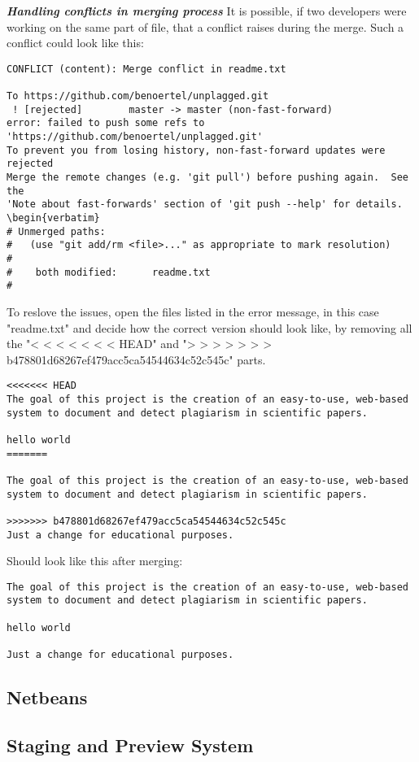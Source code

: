 \textbf{\textit{Handling conflicts in merging process}}
It is possible, if two developers were working on the same part of  file, that a conflict raises during the merge. Such a conflict could look like this:
\begin{verbatim}
CONFLICT (content): Merge conflict in readme.txt

To https://github.com/benoertel/unplagged.git
 ! [rejected]        master -> master (non-fast-forward)
error: failed to push some refs to 'https://github.com/benoertel/unplagged.git'
To prevent you from losing history, non-fast-forward updates were rejected
Merge the remote changes (e.g. 'git pull') before pushing again.  See the
'Note about fast-forwards' section of 'git push --help' for details.
\begin{verbatim}
# Unmerged paths:
#   (use "git add/rm <file>..." as appropriate to mark resolution)
#
#    both modified:      readme.txt
#
\end{verbatim}
To reslove the issues, open the files listed in the error message, in this case "readme.txt" and decide how the correct version should look like, by removing all the "< < < < < < <  HEAD" and "> > > > > > > b478801d68267ef479acc5ca54544634c52c545c" parts.

\begin{verbatim}
<<<<<<< HEAD
The goal of this project is the creation of an easy-to-use, web-based
system to document and detect plagiarism in scientific papers.

hello world
=======

The goal of this project is the creation of an easy-to-use, web-based
system to document and detect plagiarism in scientific papers.

>>>>>>> b478801d68267ef479acc5ca54544634c52c545c
Just a change for educational purposes.
\end{verbatim}

Should look like this after merging:
\begin{verbatim}
The goal of this project is the creation of an easy-to-use, web-based
system to document and detect plagiarism in scientific papers.

hello world

Just a change for educational purposes.
\end{verbatim}

\subsection{Netbeans}
\subsection{Staging and Preview System}

